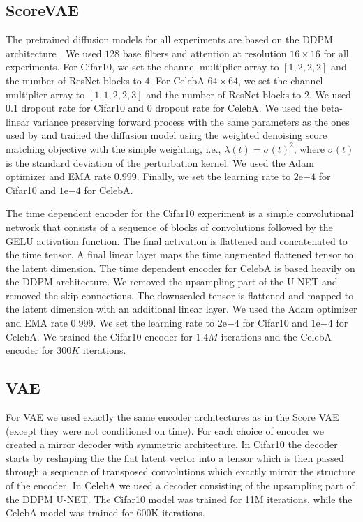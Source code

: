 \subsection{ScoreVAE}
The pretrained diffusion models for all experiments are based on the DDPM architecture \cite{ddpm}. We used $128$ base filters and attention at resolution $16\times 16$ for all experiments. For Cifar10, we set the channel multiplier array to $[1, 2, 2, 2]$ and the number of ResNet blocks to $4$. For CelebA $64\times 64$, we set the channel multiplier array to $[1, 1, 2, 2, 3]$ and the number of ResNet blocks to $2$. We used $0.1$ dropout rate for Cifar10 and $0$ dropout rate for CelebA. We used the beta-linear variance preserving forward process with the same parameters as the ones used by \cite{song2020score} and trained the diffusion model using the weighted denoising score matching objective with the simple weighting, i.e., $\lambda(t)=\sigma(t)^2$, where $\sigma(t)$ is the standard deviation of the perturbation kernel. We used the Adam optimizer and EMA rate 0.999. Finally, we set the learning rate to $2\mathrm{e}{-4}$ for Cifar10 and $1\mathrm{e}{-4}$ for CelebA.

The time dependent encoder for the Cifar10 experiment is a simple convolutional network that consists of a sequence of blocks of convolutions followed by the GELU activation function. The final activation is flattened and concatenated to the time tensor. A final linear layer maps the time augmented flattened tensor to the latent dimension. The time dependent encoder for CelebA is based heavily on the DDPM architecture. We removed the upsampling part of the U-NET and removed the skip connections. The downscaled tensor is flattened and mapped to the latent dimension with an additional linear layer. We used the Adam optimizer and EMA rate 0.999. We set the learning rate to $2\mathrm{e}{-4}$ for Cifar10 and $1\mathrm{e}{-4}$ for CelebA. We trained the Cifar10 encoder for $1.4M$ iterations and the CelebA encoder for $300K$ iterations.

\subsection{VAE}

For VAE we used exactly the same encoder architectures as in the Score VAE (except they were not conditioned on time). For each choice of encoder we created a mirror decoder with symmetric architecture. In Cifar10 the decoder starts by reshaping the the flat latent vector into a tensor which is then passed through a sequence of transposed convolutions which exactly mirror the structure of the encoder. In CelebA we used a decoder consisting of the upsampling part of the DDPM U-NET. The Cifar10 model was trained for 11M iterations, while the CelebA model was trained for 600K iterations.



